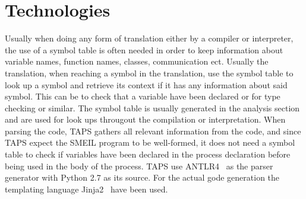 

\section{Technologies}

Usually when doing any form of translation either by a compiler or interpreter, the use of a symbol table is often needed in order to keep information about variable names, function names, classes, communication ect. Usually the translation, when reaching a symbol in the translation, use the symbol table to look up a symbol and retrieve its context if it has any information about said symbol. This can be to check that a variable have been declared or for type checking or similar. The symbol table is usually generated in the analysis section and are used for look ups througout the compilation or interpretation. When parsing the code, TAPS gathers all relevant information from the code, and since TAPS expect the SMEIL program to be well-formed, it does not need a symbol table to check if variables have been declared in the process declaration before being used in the body of the process.
TAPS use ANTLR4~\cite{antlr} as the parser generator with Python 2.7 as its source.
For the actual gode generation the templating language Jinja2~\cite{jinja2} have been used.


